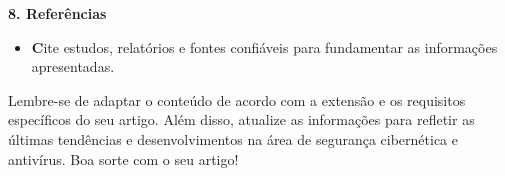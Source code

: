 \documentclass[10pt,conference,twocolumn]{article}
\begin{document}
\textbf {8. Referências}
 \begin{itemize}
\item \textbf Cite estudos, relatórios e fontes confiáveis para fundamentar as informações apresentadas.
\end{itemize}

Lembre-se de adaptar o conteúdo de acordo com a extensão e os requisitos específicos do seu artigo. Além disso, atualize as informações para refletir as últimas tendências e desenvolvimentos na área de segurança cibernética e antivírus. Boa sorte com o seu artigo!
\end{document}
